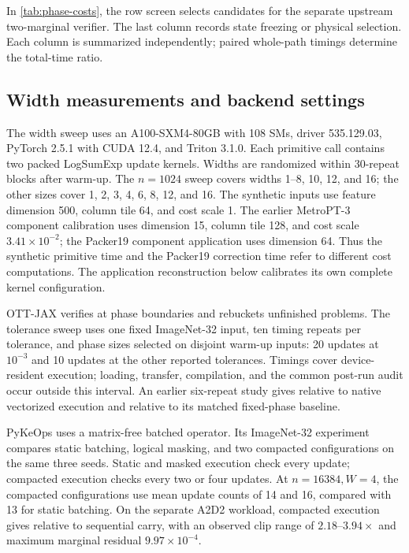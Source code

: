 

In \cref{tab:phase-costs}, the row screen selects candidates for the separate upstream two-marginal verifier. The last column records state freezing or physical selection. Each column is summarized independently; paired whole-path timings determine the total-time ratio.

\subsection{Width measurements and backend settings}
\label{sec:backend-details}

The width sweep uses an A100-SXM4-80GB with 108 SMs, driver 535.129.03, PyTorch 2.5.1 with CUDA 12.4, and Triton 3.1.0. Each primitive call contains two packed LogSumExp update kernels. Widths are randomized within 30-repeat blocks after warm-up. The $n=1024$ sweep covers widths 1--8, 10, 12, and 16; the other sizes cover 1, 2, 3, 4, 6, 8, 12, and 16. The synthetic inputs use feature dimension 500, column tile 64, and cost scale 1. The earlier MetroPT-3 component calibration uses dimension 15, column tile 128, and cost scale $3.41\times10^{-2}$; the Packer19 component application uses dimension 64. Thus the synthetic primitive time and the Packer19 correction time refer to different cost computations. The application reconstruction below calibrates its own complete kernel configuration.

OTT-JAX verifies at phase boundaries and rebuckets unfinished problems. The tolerance sweep uses one fixed ImageNet-32 input, ten timing repeats per tolerance, and phase sizes selected on disjoint warm-up inputs: 20 updates at $10^{-3}$ and 10 updates at the other reported tolerances. Timings cover device-resident execution; loading, transfer, compilation, and the common post-run audit occur outside this interval. An earlier six-repeat study gives \COTTNativeActiveSpeedup{} relative to native vectorized execution and \COTTStaticActiveSpeedup{} relative to its matched fixed-phase baseline.

PyKeOps uses a matrix-free batched operator. Its ImageNet-32 experiment compares static batching, logical masking, and two compacted configurations on the same three seeds. Static and masked execution check every update; compacted execution checks every two or four updates. At $n=16384,W=4$, the compacted configurations use mean update counts of 14 and 16, compared with 13 for static batching. On the separate A2D2 workload, compacted execution gives \CKeopsLiDARActiveSpeedup{} relative to sequential carry, with an observed clip range of $2.18$--$3.94\times$ and maximum marginal residual $9.97\times10^{-4}$.


